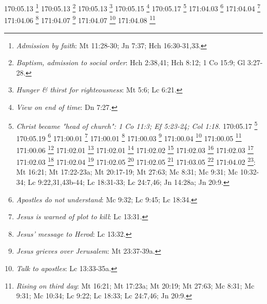 {{{{{{{{{{{{{{{{{{{{{{{{{{{{{{{{{{{{{{{{{{{{{{{{{{170:05.13 \footnote{\textit{Admission by faith}: Mt 11:28-30; Jn 7:37; Hch 16:30-31,33.}
170:05.13 \footnote{\textit{Baptism, admission to social order}: Hch 2:38,41; Hch 8:12; 1 Co 15:9; Gl 3:27-28.}
170:05.13 \footnote{\textit{Hunger & thirst for righteousness}: Mt 5:6; Lc 6:21.}
170:05.15 \footnote{\textit{View on end of time}: Dn 7:27.}
170:05.17 \footnote{\textit{Christ became "head of church": 1 Co 11:3; Ef 5:23-24; Col 1:18.}
170:05.17 \footnote{\textit{Elder brother of believers}: Mt 12:50; Mc 3:35; Lc 8:21.}
170:05.19 \footnote{\textit{Kingdom of God is at hand}: Mt 3:2; Mt 10:7; Mc 1:15; Lc 21:31.}
171:00.01 \footnote{\textit{Kingdom of Heaven}: Mt 3:2; Mt 4:17; Mt 5:3,10,19-20; Mt 7:21; Mt 8:11; Mt 10:7; Mt 11:11-12; Mt 13:11,24,31-52; Mt 16:19; Mt 18:1-4,23; Mt 19:14,23; Mt 20:1; Mt 22:2; Mt 23:13; Mt 25:1,14.}
171:00.01 \footnote{\textit{Sermon on the kingdom}: Mt 13:3-9,18-53.}
171:00.03 \footnote{\textit{Kingdom of heaven within you}: Lc 17:21.}
171:00.04 \footnote{\textit{Mother requests favored seats}: Mt 20:20-21; Mc 10:35-37.}
171:00.05 \footnote{\textit{Jesus denies request}: Mt 20:22-23; Mc 10:38-40.}
171:00.06 \footnote{\textit{Jesus calms apostles}: Mt 20:24-28; Mc 10:41-45.}
171:02.01 \footnote{\textit{Jesus addresses crowd}: Lc 14:25.}
171:02.01 \footnote{\textit{Where this happened}: Jn 1:28.}
171:02.02 \footnote{\textit{Talk on counting the cost}: Mt 10:21,37; Lc 14:26.}
171:02.03 \footnote{\textit{Cost of war}: Lc 14:31-32.}
171:02.03 \footnote{\textit{Cost of watchtower}: Lc 14:28-30.}
171:02.03 \footnote{\textit{You who follow must pay price}: Mt 10:38; Mt 16:24; Mc 8:34; Lc 9:23; Lc 14:27.}
171:02.04 \footnote{\textit{Total commitment}: Mt 8:21-22; Mt 19:21-22; Mc 10:21-22; Lc 9:59-62; Lc 14:33; Lc 18:22-23.}
171:02.05 \footnote{\textit{Salt which loses savor}: Mt 5:13; Mc 9:50; Lc 14:34-35.}
171:02.05 \footnote{\textit{Unworthy motives}: Lc 14:33-35.}
171:03.05 \footnote{\textit{The resurrection & the life}: Jn 11:25.}
171:04.02 \footnote{\textit{Warning}: crucifixion, resurrection}: Mt 16:21; Mt 17:22-23a; Mt 20:17-19; Mt 27:63; Mc 8:31; Mc 9:31; Mc 10:32-34; Lc 9:22,31,43b-44; Lc 18:31-33; Lc 24:7,46; Jn 14:28a; Jn 20:9.}
171:04.03 \footnote{\textit{Apostles do not understand}: Mc 9:32; Lc 9:45; Lc 18:34.}
171:04.04 \footnote{\textit{Jesus is warned of plot to kill}: Lc 13:31.}
171:04.06 \footnote{\textit{Jesus' message to Herod}: Lc 13:32.}
171:04.07 \footnote{\textit{Jesus grieves over Jerusalem}: Mt 23:37-39a.}
171:04.07 \footnote{\textit{Talk to apostles}: Lc 13:33-35a.}
171:04.08 \footnote{\textit{Rising on third day}: Mt 16:21; Mt 17:23a; Mt 20:19; Mt 27:63; Mc 8:31; Mc 9:31; Mc 10:34; Lc 9:22; Lc 18:33; Lc 24:7,46; Jn 20:9.}
}}}}}}}}}}}}}}}}}}}}}}}}}}}}}}}}}}}}}}}}}}}}}}}}}}

